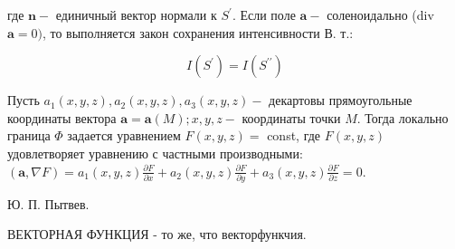 \documentclass[10pt]{article}
\begin{document}
где $\boldsymbol{n}-$ единичный вектор нормали к $S^{\prime}$. Если поле $\boldsymbol{a}-$ соленоидально (div $\boldsymbol{a}=0)$, то выполняется закон сохранения интенсивности В. т.:



\[

I\left(S^{\prime}\right)=I\left(S^{\prime \prime}\right)

\]



Пусть $a_{1}(x, y, z), a_{2}(x, y, z), a_{3}(x, y, z)-$ декартовы прямоугольные координаты вектора $\boldsymbol{a}=\boldsymbol{a}(M) ; x, y, z-$ координаты точки $M$. Тогда локально граница $\Phi$ задается уравнением $F(x, y, z)=$ const, где $F(x, y, z)$ удовлетворяет уравнению с частными производными: $(\boldsymbol{a}, \nabla F)=a_{1}(x, y, z) \frac{\partial F}{\partial x}+a_{2}(x, y, z) \frac{\partial F}{\partial y}+a_{3}(x, y, z) \frac{\partial F}{\partial z}=0$.



Ю. П. Пытвев.



ВЕКТОРНАЯ ФУНКЦИЯ - то же, что векторфункчия.
\end{document}
